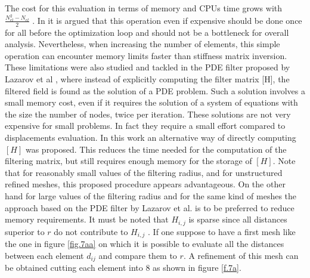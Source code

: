   The cost for this evaluation in terms of memory and CPUs time grows with $\frac{N_{el}^2-N_{el}}{2}$ . In \cite{talischi2012polytop} it is argued that this operation even if  expensive should be done once for all before the optimization loop and should not be a bottleneck for overall analysis. Nevertheless, when increasing the number of elements, this simple operation can encounter memory limits faster than stiffness matrix inversion. These limitations were also studied and tackled in the PDE filter proposed by Lazarov et al \cite{lazarov2011filters}, where instead of explicitly computing the filter matrix [H], the filtered field is found as the solution of a PDE problem. Such a solution involves a small memory cost, even if it requires the solution of a system of equations with the size the number of nodes, twice per iteration. These solutions are not very expensive for small problems. In fact they require a small effort compared to displacements evaluation. In this work an alternative way of directly computing $\left[ H \right]$ was proposed. This reduces the time needed for the computation of the filtering matrix, but still requires enough memory for the storage of $\left[ H \right]$. Note that for reasonably small values of the filtering radius, and for unstructured refined meshes, this proposed procedure appears advantageous. On the other hand for large values of the filtering radius and for the same kind of meshes the approach based on the PDE filter by Lazarov et al. \cite{lazarov2011filters} is to be preferred to reduce memory requirements. 
  It must be noted that $H_{i,j}$ is sparse since all distances superior to $r$ do not contribute to $H_{i,j}$ . If one suppose to have a first mesh like the one in figure \ref{fig.7aa} on which it is possible to evaluate all the distances between each element $d_{ij}$ and compare them to $r$.  A refinement of this mesh can be obtained cutting each element into 8 as shown in figure \ref{f.7a}.
